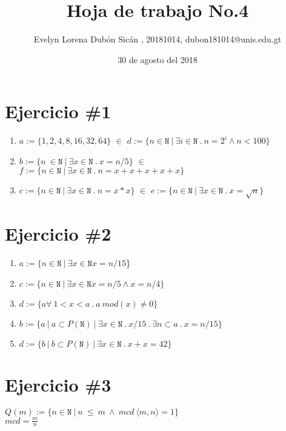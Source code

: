 \documentclass{article}
\author{Evelyn Lorena Dubón Sicán , 20181014, dubon181014@unis.edu.gt}
\title{Hoja de trabajo No.4}
\date{30 de agosto del 2018}
\begin{document}
\linespread{1.1}

\maketitle
\section*{Ejercicio \#1 }
\begin{enumerate}

        \item{$a:=\{1,2,4,8,16,32,64\}$} {$\in$} {$d := \{n\in\mathtt{N}\ |\ \exists i\in\mathtt{N}\ .\ n=2^i\wedge n<100 \}$}

        \item{$b:=\{n\ \in \mathtt{N}\ |\ \exists x \in \mathtt{N}\ .\ x=n/5 \}$} {$\in$}  {$f:=\{ n\in\mathtt{N}\ |\ \exists x\in \mathtt{N}\ .\ n=x+x+x+x+x \}$}

        \item{$c:=\{n\in \mathtt{N}\ |\ \exists x\in\mathtt{N}\ .\ n=x*x \}$} {$\in$} {$e:=\{ n\in\mathtt{N}\ |\ \exists x\in \mathtt{N}\ .\ x=\sqrt{n} \}$}

\end{enumerate}
\section*{Ejercicio \#2}
\begin{enumerate}
    \item {$a:=\{n \in \mathtt{N} \ |\ \exists x \in \mathtt{N} x= n/15 $\}}
    \item {$c:= \{ n \in \mathtt{N} \ |\  \exists x \in \mathtt{N} x= n/5 \wedge x = n/4 \} $}
     \item {$d:= \{ a \forall \ 1 < x < a \ . \ a \ mod(x) \neq 0 \} $}
    \item {$b :=\{ a \ |\ a\subset P(\mathtt{N}) \ |\ \exists x \in \mathtt{N} \ .\ x/15 \ .\ \exists n \subset a \ .\ x=n/15\} $}
    \item {$d :=\{ b \ |\ b\subset P(\mathtt{N}) \ |\ \exists x \in \mathtt{N} \ .\ x + x = 42\} $}
\end{enumerate}
\section*{Ejercicio \#3}
$Q(m):= \{ n \in \mathtt{N} \ |\ n \ \leq \  m \ \wedge \ mcd \ \langle m , n \rangle = 1  \}$ \\
 $mcd= \frac{m}{n}$
\end{document}
